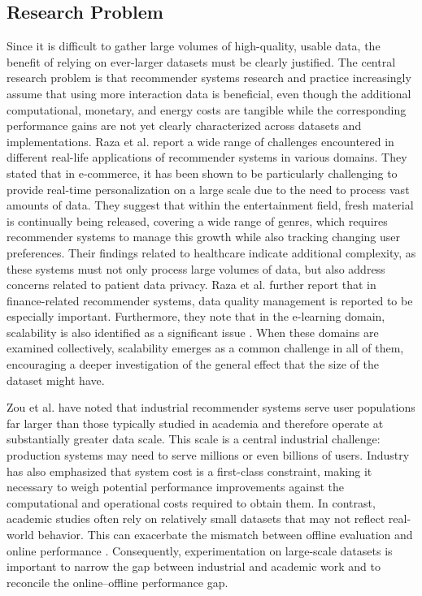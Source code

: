 \documentclass[12pt,a4paper]{article}
\begin{document}
\subsection{Research Problem}
Since it is difficult to gather large volumes of high-quality, usable data, the benefit of relying on ever-larger datasets must be clearly justified. The central research problem is that recommender systems research and practice increasingly assume that using more interaction data is beneficial, even though the additional computational, monetary, and energy costs are tangible while the corresponding performance gains are not yet clearly characterized across datasets and implementations. Raza et al. report a wide range of challenges encountered in different real-life applications of recommender systems in various domains. They stated that in e-commerce, it has been shown to be particularly challenging to provide real-time personalization on a large scale due to the need to process vast amounts of data. They suggest that within the entertainment field, fresh material is continually being released, covering a wide range of genres, which requires recommender systems to manage this growth while also tracking changing user preferences. Their findings related to healthcare indicate additional complexity, as these systems must not only process large volumes of data, but also address concerns related to patient data privacy. Raza et al. further report that in finance-related recommender systems, data quality management is reported to be especially important. Furthermore, they note that in the e-learning domain, scalability is also identified as a significant issue \cite{raza2025}. When these domains are examined collectively, scalability emerges as a common challenge in all of them, encouraging a deeper investigation of the general effect that the size of the dataset might have.

Zou et al. have noted that industrial recommender systems serve user populations far larger than those typically studied in academia and therefore operate at substantially greater data scale. This scale is a central industrial challenge: production systems may need to serve millions or even billions of users. Industry has also emphasized that system cost is a first-class constraint, making it necessary to weigh potential performance improvements against the computational and operational costs required to obtain them. In contrast, academic studies often rely on relatively small datasets that may not reflect real-world behavior. This can exacerbate the mismatch between offline evaluation and online performance \cite{zou2025}. Consequently, experimentation on large-scale datasets is important to narrow the gap between industrial and academic work and to reconcile the online--offline performance gap.
\end{document}
